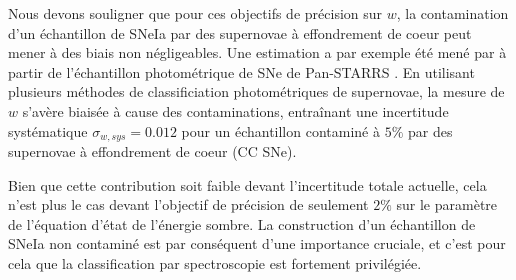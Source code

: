 \documentclass[../main/main.tex]{subfiles}
\begin{document}
Nous devons souligner que pour ces objectifs de précision sur $w$, la
contamination d'un échantillon de SNeIa par des supernovae à
effondrement de coeur peut mener à des biais non négligeables. Une
estimation a par exemple été mené par \citet{JonesScolnic17SNcontam,Jones2018} à partir de l'échantillon photométrique de SNe de
Pan-STARRS \citep[PS1,][]{ChambersPS1survey}. En utilisant plusieurs méthodes
de classificiation photométriques de supernovae, la mesure
de $w$ s'avère biaisée à cause des contaminations, entraînant une
incertitude systématique $\sigma_{w,sys}=0.012$ pour un échantillon
contaminé à $5\%$ par des supernovae à effondrement de coeur (CC SNe).

Bien que cette contribution soit faible devant l'incertitude totale
actuelle, cela n'est plus le cas devant l'objectif de précision de
seulement $2\%$ sur le paramètre de l'équation d'état de
l'énergie sombre. La construction d'un échantillon de SNeIa non
contaminé est par conséquent d'une importance cruciale, et c'est pour
cela que la classification par spectroscopie est fortement privilégiée.

%
%
\end{document}
